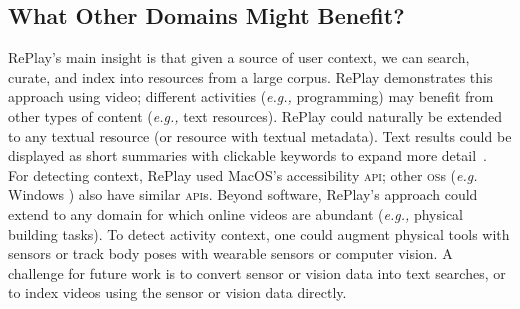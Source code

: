 \subsection{What Other Domains Might Benefit?}
RePlay's main insight is that given a source of user context, we can search, curate, and index into resources from a large corpus. RePlay demonstrates this approach using video; different activities (\textit{e.g.,} programming) may benefit from other types of content (\textit{e.g.,} text resources). RePlay could naturally be extended to any textual resource (or resource with textual metadata). Text results could be displayed as short summaries with clickable keywords to expand more detail~\cite{Ekstrand2011}. For detecting context, RePlay used Mac\-OS's accessibility \textsc{api}; other \textsc{os}s (\textit{e.g.} Windows \cite{Matejka2013}) also have similar \textsc{api}s. %
Beyond software, RePlay's approach could extend to any domain for which online videos are abundant (\textit{e.g.,} physical building tasks). To detect activity context, one could augment physical tools with sensors \cite{Schoop2016, Lukowicz2004} or track body poses with wearable sensors or computer vision. A challenge for future work is to convert sensor or vision data into text searches, or to index videos using the sensor or vision data directly. 




